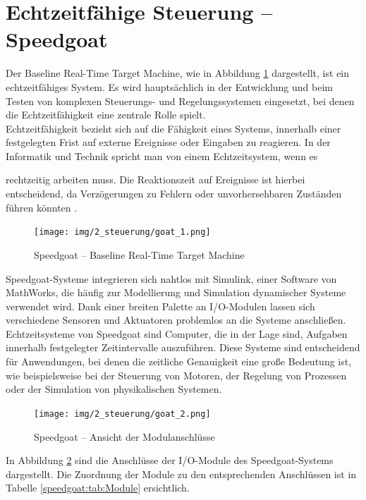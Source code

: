 \newpage


\section{Echtzeitfähige Steuerung – Speedgoat}
\label{section:speedgoat}

Der Baseline Real-Time Target Machine, wie in Abbildung \ref{speedgoat:img:steuerung_goat} dargestellt, ist ein echtzeitfähiges System. Es wird hauptsächlich in der Entwicklung und beim Testen von komplexen Steuerungs- und Regelungssystemen eingesetzt, bei denen die Echtzeitfähigkeit eine zentrale Rolle spielt.\\
Echtzeitfähigkeit bezieht sich auf die Fähigkeit eines Systems, innerhalb einer festgelegten Frist auf externe Ereignisse oder Eingaben zu reagieren. In der Informatik und Technik spricht man von einem Echtzeitsystem, wenn es

rechtzeitig arbeiten muss. Die Reaktionszeit auf Ereignisse ist hierbei entscheidend, da Verzögerungen zu Fehlern oder unvorhersehbaren Zuständen führen könnten \cite{DIN_44300}.

\pagebreak[1]
\begin{figure}[!ht]
	\begin{center}
		\texttt{[image: img/2\_steuerung/goat\_1.png]}
		\caption{Speedgoat – Baseline Real-Time Target Machine}
		\label{speedgoat:img:steuerung_goat}
	\end{center}
\end{figure}
\pagebreak[1]

Speedgoat-Systeme integrieren sich nahtlos mit Simulink, einer Software von MathWorks, die häufig zur Modellierung und Simulation dynamischer Systeme verwendet wird. Dank einer breiten Palette an I/O-Modulen lassen sich verschiedene Sensoren und Aktuatoren problemlos an die Systeme anschließen.
Echtzeitsysteme von Speedgoat sind Computer, die in der Lage sind, Aufgaben innerhalb festgelegter Zeitintervalle auszuführen. Diese Systeme sind entscheidend für Anwendungen, bei denen die zeitliche Genauigkeit eine große Bedeutung ist, wie beispielsweise bei der Steuerung von Motoren, der Regelung von Prozessen oder der Simulation von physikalischen Systemen.


\pagebreak[1]
\begin{figure}[!ht]
	\begin{center}
		\texttt{[image: img/2\_steuerung/goat\_2.png]}
		\caption{Speedgoat – Ansicht der Modulanschlüsse}
		\label{speedgoat:img:Modulanschlüsse}
	\end{center}
\end{figure}
\pagebreak[1]
In Abbildung \ref{speedgoat:img:Modulanschlüsse} sind die Anschlüsse der I/O-Module des Speedgoat-Systems dargestellt. Die Zuordnung der Module zu den entsprechenden Anschlüssen ist in Tabelle \ref{speedgoat:tab:Module} ersichtlich.

